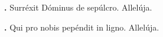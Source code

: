 \textbf{\Vbar.} Surréxit Dóminus de sepúlcro. Allelúja.

\textbf{\Rbar.} Qui pro nobis pepéndit in ligno. Allelúja.


